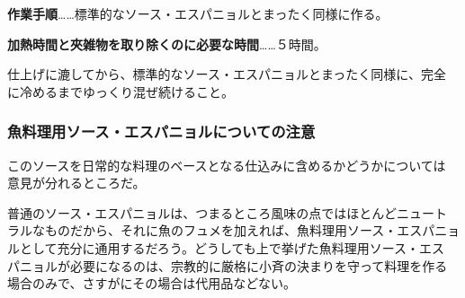 \documentclass[twoside,12Q,b5paper]{escoffierltjsbook}
\newenvironment{recette}{\begin{multicols}{2}}{\end{multicols}}
\begin{document}
\begin{recette}
\textbf{作業手順}\ldots{}\ldots{}標準的なソース・エスパニョルとまったく同様に作る。

\textbf{加熱時間と夾雑物を取り除くのに必要な時間}\ldots{}\ldots{}５時間。

仕上げに漉してから、標準的なソース・エスパニョルとまったく同様に、完全
に冷めるまでゆっくり混ぜ続けること。

\subsubsection{魚料理用ソース・エスパニョルについての注意}\label{ux9b5aux6599ux7406ux7528ux30bdux30fcux30b9ux30a8ux30b9ux30d1ux30cbux30e7ux30ebux306bux3064ux3044ux3066ux306eux6ce8ux610f}

このソースを日常的な料理のベースとなる仕込みに含めるかどうかについては
意見が分れるところだ。

普通のソース・エスパニョルは、つまるところ風味の点ではほとんどニュート
ラルなものだから、それに魚のフュメを加えれば、魚料理用ソース・エスパニョ
ルとして充分に通用するだろう。どうしても上で挙げた魚料理用ソース・エス
パニョルが必要になるのは、宗教的に厳格に小斉の決まりを守って料理を作る
場合のみで、さすがにその場合は代用品などない。





\end{recette}%
\end{document}

